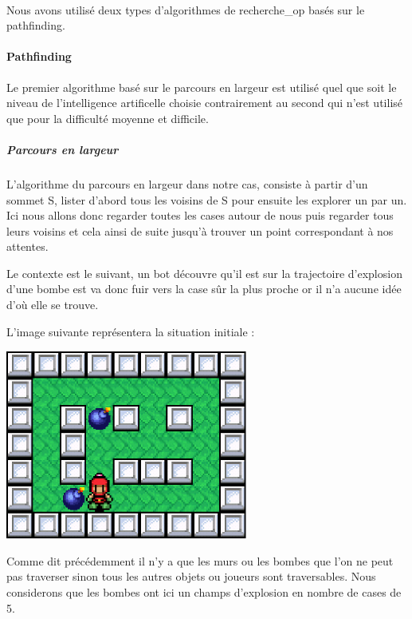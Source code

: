 		$\,$
		
		Nous avons utilisé deux types d'algorithmes de \gls{recherche_op} basés sur le \gls{pathfinding}.
		
		\paragraph{Pathfinding}
		
			Le premier algorithme basé sur le parcours en largeur est utilisé quel que soit
			le niveau de l'intelligence artificelle choisie contrairement au second qui n'est utilisé
			que pour la difficulté moyenne et difficile.
		
		\subparagraph{Parcours en largeur\\}
		
			L'algorithme du parcours en largeur dans notre cas, consiste à partir d'un sommet S,
			lister d'abord tous les voisins de S pour ensuite les explorer un par un.
			Ici nous allons donc regarder toutes les cases autour de nous puis regarder
			tous leurs voisins et cela ainsi de suite jusqu'à trouver un point
			correspondant à nos attentes.
			
			Le contexte est le suivant, un \gls{bot} découvre qu'il est sur la trajectoire
			d'explosion d'une bombe est va donc fuir vers la case sûr la plus proche or
			il n'a aucune idée d'où elle se trouve.
			
			L'image suivante représentera la situation initiale :
			
			\begin{center}
				\includegraphics[width=8cm]{./Analyse/Img/largeur_0.eps}
			\end{center}
			
			Comme dit précédemment il n'y a que les murs ou les bombes que l'on ne peut
			pas traverser sinon tous les autres objets ou joueurs sont traversables.
			Nous considerons que les bombes ont ici un champs d'explosion en nombre de
			cases de 5.			
			

